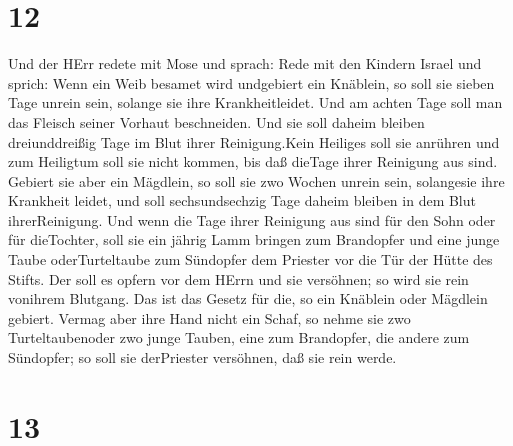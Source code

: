 \hypertarget{section-11}{%
\section{12}\label{section-11}}

 Und der HErr redete mit Mose und sprach:  Rede
mit den Kindern Israel und sprich: Wenn ein Weib besamet wird undgebiert
ein Knäblein, so soll sie sieben Tage unrein sein, solange sie ihre
Krankheitleidet.  Und am achten Tage soll man das Fleisch
seiner Vorhaut beschneiden.  Und sie soll daheim bleiben
dreiunddreißig Tage im Blut ihrer Reinigung.Kein Heiliges soll sie
anrühren und zum Heiligtum soll sie nicht kommen, bis daß dieTage ihrer
Reinigung aus sind.  Gebiert sie aber ein Mägdlein, so soll
sie zwo Wochen unrein sein, solangesie ihre Krankheit leidet, und soll
sechsundsechzig Tage daheim bleiben in dem Blut ihrerReinigung.
 Und wenn die Tage ihrer Reinigung aus sind für den Sohn
oder für dieTochter, soll sie ein jährig Lamm bringen zum Brandopfer und
eine junge Taube oderTurteltaube zum Sündopfer dem Priester vor die Tür
der Hütte des Stifts.  Der soll es opfern vor dem HErrn und
sie versöhnen; so wird sie rein vonihrem Blutgang. Das ist das Gesetz
für die, so ein Knäblein oder Mägdlein gebiert.  Vermag aber
ihre Hand nicht ein Schaf, so nehme sie zwo Turteltaubenoder zwo junge
Tauben, eine zum Brandopfer, die andere zum Sündopfer; so soll sie
derPriester versöhnen, daß sie rein werde.

\hypertarget{section-12}{%
\section{13}\label{section-12}}

